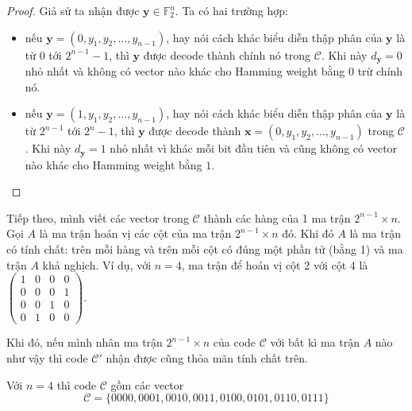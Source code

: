 \begin{proof}
    Giả sử ta nhận được $\bm{y} \in \mathbb{F}_2^n$. Ta có hai trường hợp:
    \begin{itemize}
        \item nếu $\bm{y} = (0, y_1, y_2, \ldots, y_{n-1})$, hay nói cách khác biểu diễn thập phân của $\bm{y}$ là từ $0$ tới $2^{n-1} - 1$, thì $\bm{y}$ được decode thành chính nó trong $\mathcal{C}$. Khi này $d_{\bm{y}} = 0$ nhỏ nhất và không có vector nào khác cho Hamming weight bằng $0$ trừ chính nó.
        \item nếu $\bm{y} = (1, y_1, y_2, \ldots, y_{n-1})$, hay nói cách khác biểu diễn thập phân của $\bm{y}$ là từ $2^{n-1}$ tới $2^n - 1$, thì $\bm{y}$ được decode thành $\bm{x} = (0, y_1, y_2, \ldots, y_{n-1})$ trong $\mathcal{C}$. Khi này $d_{\bm{y}} = 1$ nhỏ nhất vì khác mỗi bit đầu tiên và cũng không có vector nào khác cho Hamming weight bằng $1$.
    \end{itemize}
\end{proof}

Tiếp theo, mình viết các vector trong $\mathcal{C}$ thành các hàng của 1 ma trận $2^{n-1} \times n$. Gọi $A$ là ma trận hoán vị các cột của ma trận $2^{n-1} \times n$ đó. Khi đó $A$ là ma trận có tính chất: trên mỗi hàng và trên mỗi cột có đúng một phần tử (bằng 1) và ma trận $A$ khả nghịch. Ví dụ, với $n=4$, ma trận để hoán vị cột 2 với cột 4 là $\begin{pmatrix}1 & 0 & 0 & 0 \\ 0 & 0 & 0 & 1 \\ 0 & 0 & 1 & 0 \\ 0 & 1 & 0 & 0 \end{pmatrix}$.

Khi đó, nếu mình nhân ma trận $2^{n-1} \times n$ của code $\mathcal{C}$ với bất kì ma trận $A$ nào như vậy thì code $\mathcal{C}'$ nhận được cũng thỏa mãn tính chất trên.

\begin{example}
    Với $n=4$ thì code $\mathcal{C}$ gồm các vector \[ \mathcal{C} = \{ 0000, 0001, 0010, 0011, 0100, 0101, 0110, 0111 \} \]
\end{example}

